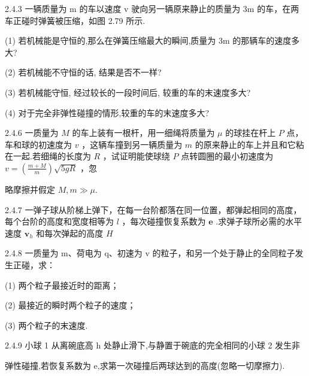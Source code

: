 \begin{problem}{2.4.3}
一辆质量为 m 的车以速度 v 驶向另一辆原来静止的质量为 3m 的车，在两车正碰时弹簧被压缩，如图 2.79 所示.

(1) 若机械能是守恒的,那么在弹簧压缩最大的瞬间,质量为 3m 的那辆车的速度多大?

(2) 若机械能不守恒的话, 结果是否不一样?

(3) 若机械能守恒, 经过较长的一段时间后, 较重的车的末速度多大?

(4) 对于完全非弹性碰撞的情形,较重的车的末速度多大?
\begin{center}

\end{center}
\end{problem}
\clearpage


\begin{problem}{2.4.6}
一质量为 $M$ 的车上装有一根杆，用一细绳将质量为 $\mu$ 的球挂在杆上 $P$ 点，车和球的初速度为 $v$ ，这辆车撞到另一辆质量为 $m$ 的原来静止的车上并且和它粘在一起.若细绳的长度为 $R$ ，试证明能使球绕 $P$ 点转圆圈的最小初速度为 $v = \left(\frac{m + M}{m}\right)\sqrt{5gR}$ ，忽

略摩擦并假定 $M, m \gg \mu.$
\begin{center}

\end{center}
\end{problem}
\clearpage


\begin{problem}{2.4.7}
一弹子球从阶梯上弹下，在每一台阶都落在同一位置，都弹起相同的高度，每个台阶的高度和宽度相等为 $l$ ，每次碰撞恢复系数为 $\bm{e}$ .求弹子球所必需的水平速度 $\bm{v}_{h}$ 和每次弹起的高度 $H$
\end{problem}
\clearpage


\begin{problem}{2.4.8}
一质量为 m、荷电为 q、初速为 v 的粒子，和另一个处于静止的全同粒子发生正碰，求：

(1) 两个粒子最接近时的距离；

(2) 最接近的瞬时两个粒子的速度；

(3) 两个粒子的末速度.
\end{problem}
\clearpage


\begin{problem}{2.4.9}
小球 1 从离碗底高 h 处静止滑下,与静置于碗底的完全相同的小球 2 发生非

弹性碰撞,若恢复系数为 e,求第一次碰撞后两球达到的高度(忽略一切摩擦力).
\end{problem}
\clearpage


